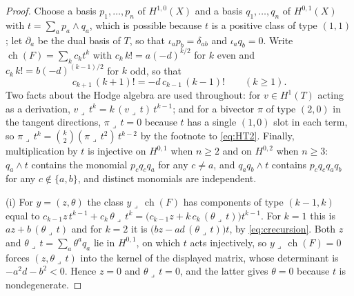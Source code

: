 \documentclass[11pt,reqno]{amsart}
\theoremstyle{plain}
\theoremstyle{definition}
\theoremstyle{remark}
\DeclareMathOperator{\ch}{ch}
\begin{document}
\begin{proof}
Choose a basis $p_{1},\dots,p_{n}$ of $H^{1,0}(X)$ and a basis
$q_{1},\dots,q_{n}$ of $H^{0,1}(X)$ with $t=\sum_{a}p_{a}\wedge q_{a}$, which
is possible because $t$ is a positive class of type $(1,1)$; let
$\partial_{a}$ be the dual basis of $T$, so that $\iota_{a}p_{b}=\delta_{ab}$
and $\iota_{a}q_{b}=0$. Write $\ch(F)=\sum_{k}c_{k}t^{k}$ with
$c_{k}\,k!=a(-d)^{k/2}$ for $k$ even and $c_{k}\,k!=b(-d)^{(k-1)/2}$ for $k$
odd, so that
\begin{equation}\label{eq:crecursion}
  c_{k+1}\,(k+1)!=-d\,c_{k-1}\,(k-1)!\qquad(k\ge1).
\end{equation}
Two facts about the Hodge algebra are used throughout: for $v\in H^{1}(T)$
acting as a derivation, $v\lrcorner\,t^{k}=k\,(v\lrcorner\,t)\,t^{k-1}$; and
for a bivector $\pi$ of type $(2,0)$ in the tangent directions,
$\pi\lrcorner\,t=0$ because $t$ has a single $(1,0)$ slot in each term, so
$\pi\lrcorner\,t^{k}=\binom{k}{2}(\pi\lrcorner\,t^{2})\,t^{k-2}$ by the footnote
to \eqref{eq:HT2}. Finally, multiplication by $t$ is injective on $H^{0,1}$
when $n\ge2$ and on $H^{0,2}$ when $n\ge3$: $q_{a}\wedge t$ contains the
monomial $p_{c}q_{c}q_{a}$ for any $c\ne a$, and $q_{a}q_{b}\wedge t$ contains
$p_{c}q_{c}q_{a}q_{b}$ for any $c\notin\{a,b\}$, and distinct monomials are
independent.

(i) For $y=(z,\theta)$ the class $y\lrcorner\,\ch(F)$ has components of type
$(k-1,k)$ equal to $c_{k-1}z\,t^{k-1}+c_{k}\,\theta\lrcorner\,t^{k}
=\bigl(c_{k-1}z+k\,c_{k}\,(\theta\lrcorner\,t)\bigr)t^{k-1}$. For $k=1$ this
is $az+b\,(\theta\lrcorner\,t)$ and for $k=2$ it is
$\bigl(bz-ad\,(\theta\lrcorner\,t)\bigr)t$, by \eqref{eq:crecursion}. Both
$z$ and $\theta\lrcorner\,t=\sum_{a}\theta^{a}q_{a}$ lie in $H^{0,1}$, on which
$t$ acts injectively, so $y\lrcorner\,\ch(F)=0$ forces
$(z,\theta\lrcorner\,t)$ into the kernel of the displayed matrix, whose
determinant is $-a^{2}d-b^{2}<0$. Hence $z=0$ and $\theta\lrcorner\,t=0$, and
the latter gives $\theta=0$ because $t$ is nondegenerate.


\end{proof}
\end{document}
